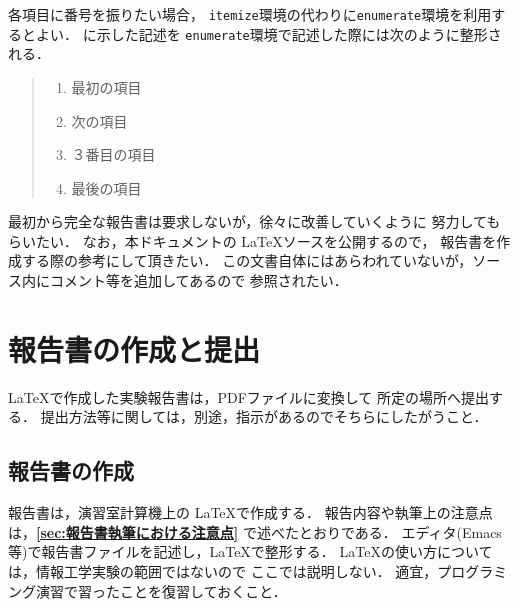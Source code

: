 \documentclass{jarticle}[11pt]
\newcommand{\figref}[1]{\makebox{図~\ref{#1}}}
\begin{document}
各項目に番号を振りたい場合，
\verb|itemize|環境の代わりに\verb|enumerate|環境を利用するとよい．
\figref{fig:verbatim環境による列挙の記述例}に示した記述を
\verb|enumerate|環境で記述した際には次のように整形される．
\begin{quote}
\begin{enumerate}
  \item 最初の項目
  \item 次の項目
  \item ３番目の項目
  \item 最後の項目
\end{enumerate}
\end{quote}

最初から完全な報告書は要求しないが，徐々に改善していくように
努力してもらいたい．
なお，本ドキュメントの \LaTeX ソースを公開するので，
報告書を作成する際の参考にして頂きたい．
この文書自体にはあらわれていないが，ソース内にコメント等を追加してあるので
参照されたい．


\section{報告書の作成と提出}
\label{sec:報告書の作成と提出}
\LaTeX で作成した実験報告書は，PDFファイルに変換して
所定の場所へ提出する．
提出方法等に関しては，別途，指示があるのでそちらにしたがうこと．

\subsection{報告書の作成}
報告書は，演習室計算機上の \LaTeX で作成する．
報告内容や執筆上の注意点は，{\bf \ref{sec:報告書執筆における注意点}}
で述べたとおりである．
エディタ(Emacs等)で報告書ファイルを記述し，\LaTeX で整形する．
\LaTeX の使い方については，情報工学実験の範囲ではないので
ここでは説明しない．
適宜，プログラミング演習で習ったことを復習しておくこと．
\end{document}
